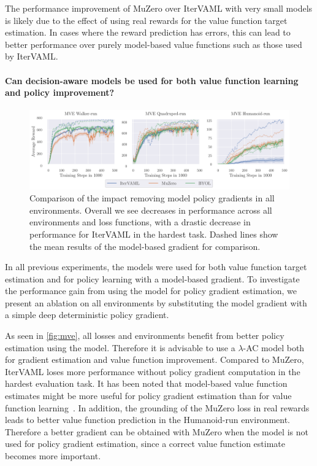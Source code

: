The performance improvement of MuZero over IterVAML with very small models is likely due to the effect of using real rewards for the value function target estimation.
In cases where the reward prediction has errors, this can lead to better performance over purely model-based value functions such as those used by IterVAML.

\paragraph{Can decision-aware models be used for both value function learning and policy improvement?}
\label{sec:experiments_mve}

\begin{figure}[b]
    \centering
    \includegraphics[width=\textwidth]{figures/lambda/mve_b_legend.pdf}
    \caption{Comparison of the impact removing model policy gradients in all environments. Overall we see decreases in performance across all environments and loss functions, with a drastic decrease in performance for IterVAML in the hardest task. Dashed lines show the mean results of the model-based gradient for comparison.}
    \label{fig:mve}
\end{figure}

In all previous experiments, the models were used for both value function target estimation and for policy learning with a model-based gradient.
To investigate the performance gain from using the model for policy gradient estimation, we present an ablation on all environments by substituting the model gradient with a simple deep deterministic policy gradient.

As seen in \autoref{fig:mve}, all losses and environments benefit from better policy estimation using the model.
Therefore it is advisable to use a $\lambda$-AC model both for gradient estimation and value function improvement.
Compared to MuZero, IterVAML loses more performance without policy gradient computation in the hardest evaluation task.
It has been noted that model-based value function estimates might be more useful for policy gradient estimation than for value function learning~\parencite{amos2021model,ghugare2023simplifying}.
In addition, the grounding of the MuZero loss in real rewards leads to better value function prediction in the Humanoid-run environment.
Therefore a better gradient can be obtained with MuZero when the model is not used for policy gradient estimation, since a correct value function estimate becomes more important.

